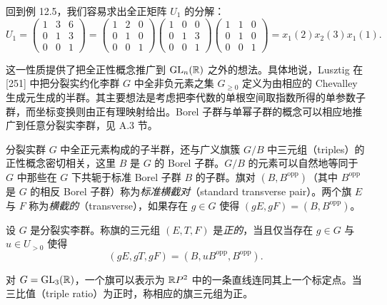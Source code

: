 \begin{example}[12.9]
回到例 12.5，我们容易求出全正矩阵 $U_1$ 的分解：
\[
U_1=\begin{pmatrix} 1 & 3 & 6\\ 0 & 1 & 3\\ 0 & 0 & 1\end{pmatrix}
=\begin{pmatrix} 1 & 2 & 0\\ 0 & 1 & 0\\ 0 & 0 & 1\end{pmatrix}
\begin{pmatrix} 1 & 0 & 0\\ 0 & 1 & 3\\ 0 & 0 & 1\end{pmatrix}
\begin{pmatrix} 1 & 1 & 0\\ 0 & 1 & 0\\ 0 & 0 & 1\end{pmatrix}
=x_1(2)x_2(3)x_1(1).
\]
\end{example}

这一性质提供了把全正性概念推广到 $\operatorname{GL}_n(\mathbb{R})$ 之外的想法。具体地说，Lusztig 在 [251] 中把分裂实约化李群 $G$ 中全非负元素之集 $G_{\ge 0}$ 定义为由相应的 Chevalley 生成元生成的半群。其主要想法是考虑把李代数的单根空间取指数所得的单参数子群，而坐标变换则由正有理映射给出。Borel 子群与单幂子群的概念可以相应地推广到任意分裂实李群，见 A.3 节。

分裂实群 $G$ 中全正元素构成的子半群，还与广义旗簇 $G/B$ 中三元组（triples）的正性概念密切相关，这里 $B$ 是 $G$ 的 Borel 子群。$G/B$ 的元素可以自然地等同于 $G$ 中那些在 $G$ 下共轭于标准 Borel 子群 $B$ 的子群。旗对 $(B,B^{\mathrm{opp}})$（其中 $B^{\mathrm{opp}}$ 是 $G$ 的相反 Borel 子群）称为\emph{标准横截对}（standard transverse pair）。两个旗 $E$ 与 $F$ 称为\emph{横截的}（transverse），如果存在 $g\in G$ 使得 $(gE,gF)=(B,B^{\mathrm{opp}})$。

\begin{definition}[12.10]
设 $G$ 是分裂实李群。称旗的三元组 $(E,T,F)$ 是\emph{正的}，当且仅当存在 $g\in G$ 与 $u\in U_{>0}$ 使得
\[
(gE,gT,gF)=(B,uB^{\mathrm{opp}},B^{\mathrm{opp}}).
\]
\end{definition}

\begin{example}[12.11]
对 $G=\operatorname{GL}_3(\mathbb{R})$，一个旗可以表示为 $\mathbb{R} P^2$ 中的一条直线连同其上一个标定点。当三比值（triple ratio）为正时，称相应的旗三元组为正。
\end{example}

